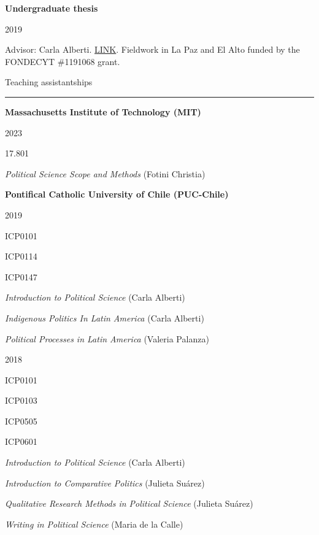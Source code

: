 \documentclass[a4paper, 12pt]{article}
\begin{document}
\textbf{Undergraduate thesis}

\begin{multicols}{2}

2019

\columnbreak

 Advisor: Carla Alberti. \href{https://ssrn.com/abstract=3866860}{LINK}. Fieldwork in La Paz and El Alto funded by the FONDECYT \#1191068 grant.

\end{multicols}




\newpage
\large Teaching assistantships
\smallskip
\hrule
\normalsize


\bigskip
\textbf{Massachusetts Institute of Technology (MIT)}

\begin{multicols}{3}

2023

\columnbreak

17.801

\columnbreak

\textit{Political Science Scope and Methods} (Fotini Christia)

\end{multicols}


\textbf{Pontifical Catholic University of Chile (PUC-Chile)}


\begin{multicols}{3}

2019

\columnbreak

ICP0101

ICP0114

ICP0147

\columnbreak

\textit{Introduction to Political Science} (Carla Alberti)

\textit{Indigenous Politics In Latin America} (Carla Alberti)

\textit{Political Processes in Latin America} (Valeria Palanza)

\end{multicols}


\begin{multicols}{3}

2018

\columnbreak

ICP0101

ICP0103

ICP0505

ICP0601

\columnbreak

\textit{Introduction to Political Science} (Carla Alberti)

\textit{Introduction to Comparative Politics} (Julieta Suárez)

\textit{Qualitative Research Methods in Political Science} (Julieta Suárez)

\textit{Writing in Political Science} (Maria de la Calle)

\end{multicols}
\end{document}
